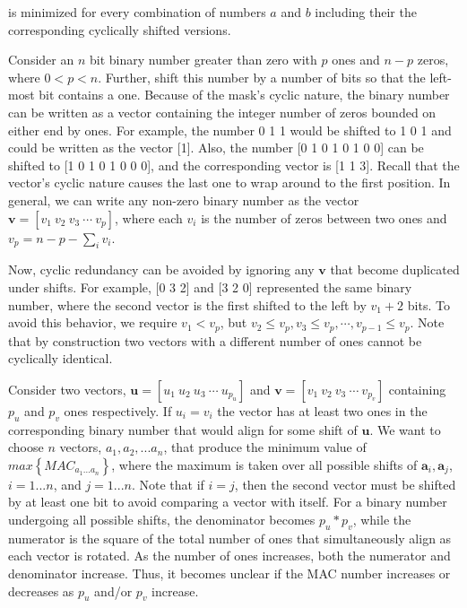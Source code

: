 \documentclass[3p,times]{elsarticle}
\begin{document}
is minimized for every combination of numbers $a$ and $b$ including their the corresponding cyclically shifted versions.

Consider an $n$ bit binary number greater than zero with $p$ ones and $n-p$ zeros, where $0<p<n$.  
Further, shift this number by a number of bits so that the left-most bit contains a one.  
Because of the mask's cyclic nature, the binary number can be written as a vector containing the integer number of zeros bounded on either end by ones.  
For example, the number 0 1 1 would be shifted to 1 0 1 and could be written as the vector [1].  
Also, the number [0 1 0 1 0 1 0 0] can be shifted to [1 0 1 0 1 0 0 0], and the corresponding vector is [1 1 3].  
Recall that the vector's cyclic nature causes the last one to wrap around to the first 
position.  
In general, we can write any non-zero binary number as the vector $\textbf{v}=\left[v_1\ v_2\ v_3\ \cdots\ v_p\right]$, where each $v_i$ is the number of zeros between two ones and $v_p=n-p-\sum\limits_{i} v_i$.  

Now, cyclic redundancy can be avoided by ignoring any $\textbf{v}$ that become duplicated under shifts.  
For example, [0 3 2] and [3 2 0] represented the same binary number, where the second vector is the first shifted to the left by $v_1+2$ bits.  
To avoid this behavior, we require $v_{1}<v_p$, but $v_2\le v_p, v_3\le v_p, \cdots, v_{p-1}\le v_p$.  
Note that by construction two vectors with a different number of ones cannot be cyclically identical.

Consider two vectors, $\textbf{u}=\left[u_1\ u_2\ u_3\ \cdots\ u_{p_u}\right]$ and $\textbf{v}=\left[v_1\ v_2\ v_3\ \cdots\ v_{p_v}\right]$ containing $p_u$ and $p_v$ ones respectively.  
If $u_i=v_i$ the vector has at least two ones in the corresponding binary number that would align for some shift of $\textbf{u}$.  
We want to choose $n$ vectors, $a_1, a_2, ... a_n$, that produce the minimum value of $max\left\{MAC_{a_1...a_n}\right\}$, where the maximum is taken over all possible shifts of $\textbf{a}_i, \textbf{a}_j$, $i=1...n$, and $j=1...n$.  
Note that if $i=j$, then the second vector must be shifted by at least one bit to avoid comparing a vector with itself.  
For a binary number undergoing all possible shifts, the denominator becomes $p_u * p_v$, while the numerator is the square of the total number of ones that simultaneously align as each vector is rotated.  
As the number of ones increases, both the numerator and denominator increase.   
Thus, it becomes unclear if the MAC number increases or decreases as $p_u$ and/or $p_v$ increase.
\end{document}
